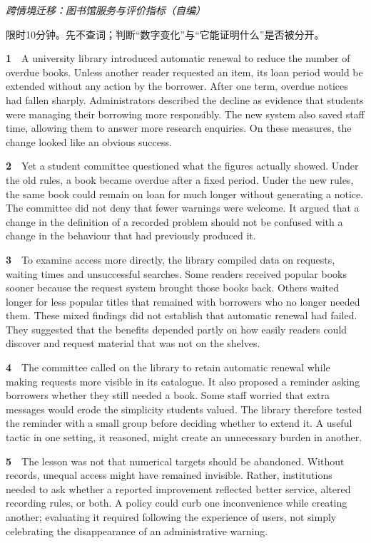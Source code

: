 \documentclass[a4paper,11pt,openany]{report}
\begin{document}
\emph{跨情境迁移：图书馆服务与评价指标（自编）}

限时10分钟。先不查词；判断``数字变化''与``它能证明什么''是否被分开。

\textbf{1}　A university library introduced automatic renewal to reduce the number of overdue books. Unless another reader requested an item, its loan period would be extended without any action by the borrower. After one term, overdue notices had fallen sharply. Administrators described the decline as evidence that students were managing their borrowing more responsibly. The new system also saved staff time, allowing them to answer more research enquiries. On these measures, the change looked like an obvious success.

\textbf{2}　Yet a student committee questioned what the figures actually showed. Under the old rules, a book became overdue after a fixed period. Under the new rules, the same book could remain on loan for much longer without generating a notice. The committee did not deny that fewer warnings were welcome. It argued that a change in the definition of a recorded problem should not be confused with a change in the behaviour that had previously produced it.

\textbf{3}　To examine access more directly, the library compiled data on requests, waiting times and unsuccessful searches. Some readers received popular books sooner because the request system brought those books back. Others waited longer for less popular titles that remained with borrowers who no longer needed them. These mixed findings did not establish that automatic renewal had failed. They suggested that the benefits depended partly on how easily readers could discover and request material that was not on the shelves.

\textbf{4}　The committee called on the library to retain automatic renewal while making requests more visible in its catalogue. It also proposed a reminder asking borrowers whether they still needed a book. Some staff worried that extra messages would erode the simplicity students valued. The library therefore tested the reminder with a small group before deciding whether to extend it. A useful tactic in one setting, it reasoned, might create an unnecessary burden in another.

\textbf{5}　The lesson was not that numerical targets should be abandoned. Without records, unequal access might have remained invisible. Rather, institutions needed to ask whether a reported improvement reflected better service, altered recording rules, or both. A policy could curb one inconvenience while creating another; evaluating it required following the experience of users, not simply celebrating the disappearance of an administrative warning.
\end{document}
